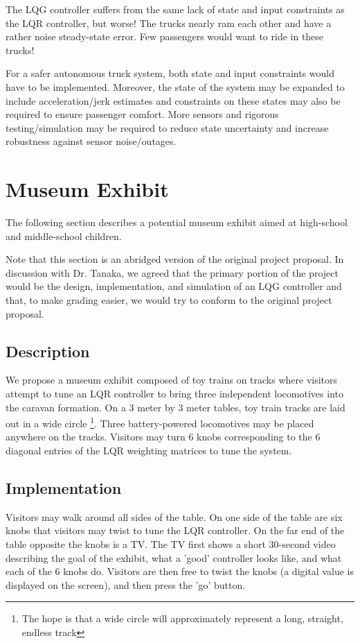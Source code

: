 \documentclass[12pt,onecolumn,reqno]{amsart}
\begin{document}
The LQG controller suffers from the same lack of state and input constraints as
the LQR controller, but worse! The trucks nearly ram each other and have a
rather noise steady-state error. Few passengers would want to ride in these
trucks!

For a safer autonomous truck system, both state and input constraints would have
to be implemented. Moreover, the state of the system may be expanded to include
acceleration/jerk estimates and constraints on these states may also be required
to ensure passenger comfort. More sensors and rigorous testing/simulation may be
required to reduce state uncertainty and increase robustness against sensor
noise/outages.


\section{Museum Exhibit}
The following section describes a potential museum exhibit aimed at high-school
and middle-school children.

Note that this section is an abridged version of the original project proposal.
In discussion with Dr. Tanaka, we agreed that the primary portion of the project
would be the design, implementation, and simulation of an LQG controller and
that, to make grading easier, we would try to conform to the original project
proposal.

\subsection{Description}
We propose a museum exhibit composed of toy trains on tracks where visitors
attempt to tune an LQR controller to bring three independent locomotives into
the caravan formation. On a 3 meter by 3 meter tables, toy train tracks are laid
out in a wide circle \footnote {The hope is that a wide circle will
approximately represent a long, straight, endless track}. Three battery-powered
locomotives may be placed anywhere on the tracks. Visitors may turn 6 knobs
corresponding to the 6 diagonal entries of the LQR weighting matrices to tune
the system.


\subsection{Implementation}
Visitors may walk around all sides of the table. On one side of the table are
six knobs that visitors may twist to tune the LQR controller. On the far end of
the table opposite the knobs is a TV. The TV first shows a short 30-second video
describing the goal of the exhibit, what a 'good' controller looks like, and
what each of the 6 knobs do. Visitors are then free to twist the knobs (a
digital value is displayed on the screen), and then press the 'go' button.
\end{document}
